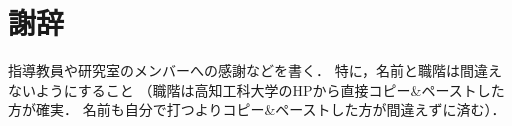 \chapter*{謝辞}

指導教員や研究室のメンバーへの感謝などを書く．
特に，名前と職階は間違えないようにすること
（職階は高知工科大学のHPから直接コピー{\&}ペーストした方が確実．
名前も自分で打つよりコピー{\&}ペーストした方が間違えずに済む）．
